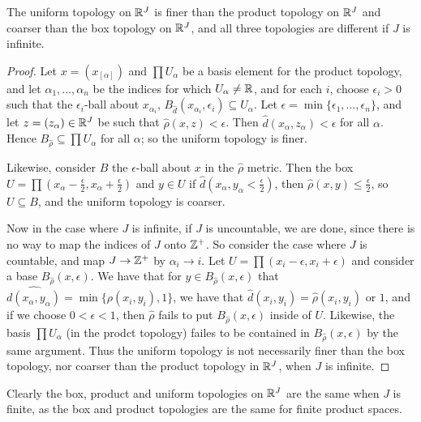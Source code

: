 \begin{theorem}\label{2.2.8}
    The uniform topology on $\mathbb{R}^J$ is finer than the product topology on  $\mathbb{R}^J$ and coarser than
    the box topology on  $\mathbb{R}^J$, and all three topologies are different if  $J$ is infinite.
\end{theorem}
\begin{proof}
    Let $x=(x_[\alpha])$ and $\prod{U_{\alpha}}$ be a basis element for the product topology, and
    let $\alpha_1 ,\dots, \alpha_n$ be the indices for which $U_{\alpha} \neq \mathbb{R}$, and for each $i$,
    choose  $\epsilon_i>0$ such that the  $\epsilon_i$-ball about  $x_{\alpha_i}$,
    $B_{\hat{d}}(x_{\alpha_i},\epsilon_i) \subseteq U_{\alpha}$. Let $\epsilon=\min\{\epsilon_1,
    \dots, \epsilon_n\}$, and let $z=(z_{\alpha}) \in \mathbb{R}^J$ be such that $\hat{\rho}(x,z)<\epsilon$.
    Then $\hat{d}(x_{\alpha},z_{\alpha})<\epsilon$ for all $\alpha$. Hence  $B_{\hat{\rho}}
    \subseteq \prod{U_{\alpha}}$ for all $\alpha$; so the uniform topology is finer.

    Likewise, consider $B$ the $\epsilon$-ball about  $x$ in the  $\hat{\rho}$ metric. Then the box
    $U=\prod{(x_{\alpha}-\frac{\epsilon}{2},x_{\alpha}+\frac{\epsilon}{2})}$ and $y \in U$ if
    $\hat{d}(x_{\alpha},y_{\alpha}<\frac{\epsilon}{2})$, then $\hat {\rho}(x,y) \leq
    \frac{\epsilon}{2}$, so $U \subseteq B$, and the uniform topology is coarser.

    Now in the case where  $J$ is infinite, if  $J$ is uncountable, we are done, since there is no
    way to map the indices of  $J$ onto  $\mathbb{Z}^+$. So consider the case where  $J$ is countable, and
    map  $J \rightarrow \mathbb{Z}^+$ by  $\alpha_i \rightarrow i$. Let
    $U=\prod{(x_i-\epsilon,x_i+\epsilon)}$ and consider a base $B_{\hat{\rho}}(x,\epsilon)$. We have
    that for  $y \in B_{\hat{\rho}}(x,\epsilon)$ that
    $\hat{d(x_{\alpha},y_{\alpha})}=\min\{\rho(x_i,y_i),1\}$, we have that
    $\hat{d}(x_i,y_i)=\hat{\rho}(x_i,y_i)$ or $1$, and if we choose  $0<\epsilon<1$, then
    $\hat{\rho}$ fails to put $B_{\hat{\rho}}(x,\epsilon)$ inside of $U$. Likewise, the basis
    $\prod{U_{\alpha}}$ (in the prodct topology) failes to be contained in
    $B_{\hat{\rho}}(x,\epsilon)$ by the same argument. Thus the uniform topology is not necessarily finer than
    the box topology, nor coarser than the product topology in $\mathbb{R}^J$, when $J$ is infinite.
\end{proof}
\begin{remark}
    Clearly the box, product and uniform topologies on $\mathbb{R}^J$ are the same when  $J$ is finite, as
    the box and product topologies are the same for finite product spaces.
\end{remark}

